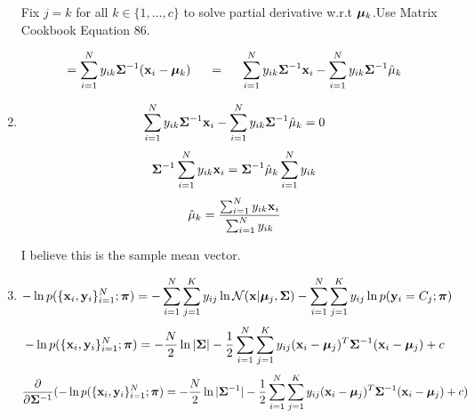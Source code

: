 \documentclass[submit]{harvardml}
\begin{document}
\begin{enumerate}
\begin{equation*}
        \end{equation*}
        \begin{center}
            Fix $j = k$ for all $k \in \{1, \ldots, c\}$ to solve partial derivative w.r.t $\boldsymbol{\mu}_k$.\newline Use Matrix Cookbook Equation 86.
        \end{center}
        \begin{equation*}
            = \sum_{i=1}^{N} y_{ik} \mathbf{\Sigma}^{-1}(\mathbf{x}_i - \boldsymbol{\mu}_k) \hspace{.5cm}=\hspace{.5cm} \sum_{i=1}^{N} y_{ik} \mathbf{\Sigma}^{-1}\mathbf{x}_i - \sum_{i=1}^{N} y_{ik} \mathbf{\Sigma}^{-1}\hat\mu_k
        \end{equation*}
        \item
        \begin{equation*}
            \sum_{i=1}^{N} y_{ik} \mathbf{\Sigma}^{-1}\mathbf{x}_i - \sum_{i=1}^{N} y_{ik} \mathbf{\Sigma}^{-1}\hat\mu_k = 0
        \end{equation*}
        \begin{equation*}
            \mathbf{\Sigma}^{-1}\sum_{i=1}^{N} y_{ik}\mathbf{x}_i = \mathbf{\Sigma}^{-1}\hat\mu_k \sum_{i=1}^{N} y_{ik}
        \end{equation*}
        \begin{equation*}
            \hat\mu_k = \frac{\sum_{i=1}^{N} y_{ik}\mathbf{x}_i}{\sum_{i=1}^{N} y_{ik}}
        \end{equation*}
        \begin{center}
            I believe this is the sample mean vector.
        \end{center}
        \item
        \begin{equation*}
            -\ln p(\{\mathbf{x}_{i}, \mathbf{y}_{i}\}_{i=1}^{N}; \boldsymbol{\pi}) = -\sum_{i=1}^{N} \sum_{j=1}^{K} y_{ij} \ln \mathcal{N}(\mathbf{x} |  \boldsymbol{\mu}_j, \mathbf{\Sigma}) -\sum_{i=1}^{N} \sum_{j=1}^{K} y_{ij}\ln  p(\mathbf{y}_{i} = C_j; \boldsymbol{\pi})
        \end{equation*}
        \begin{equation*}
            -\ln p(\{\mathbf{x}_{i}, \mathbf{y}_{i}\}_{i=1}^{N}; \boldsymbol{\pi}) = -\frac{N}{2} \ln |\mathbf{\Sigma}| -\frac{1}{2}\sum_{i=1}^{N} \sum_{j=1}^{K} y_{ij} (\mathbf{x}_i - \boldsymbol{\mu}_j)^T \mathbf{\Sigma}^{-1}(\mathbf{x}_i - \boldsymbol{\mu}_j) + c
        \end{equation*}
        \begin{equation*}
            \frac{\partial}{\partial \bSigma^{-1}}(-\ln p(\{\boldx_{i}, \boldy_{i}\}_{i=1}^{N}; \bpi) = -\frac{N}{2} \ln |\bSigma^{-1}| -\frac{1}{2}\sum_{i=1}^{N} \sum_{j=1}^{K} y_{ij} (\boldx_i - \bmu_j)^T\bSigma^{-1}(\boldx_i - \bmu_j) + c)

\end{equation*}
\end{enumerate}
\end{document}
